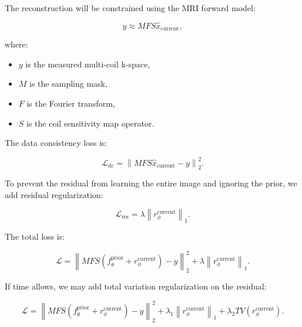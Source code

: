 \documentclass[11pt,a4paper]{article}
\begin{document}
The reconstruction will be constrained using the MRI forward model:

\begin{equation}
    y
    \approx
    MFS\hat{x}_{\mathrm{current}},
\end{equation}

where:

\begin{itemize}
    \item $y$ is the measured multi-coil k-space,
    \item $M$ is the sampling mask,
    \item $F$ is the Fourier transform,
    \item $S$ is the coil sensitivity map operator.
\end{itemize}

The data consistency loss is:

\begin{equation}
    \mathcal{L}_{\mathrm{dc}}
    =
    \left\|
    MFS\hat{x}_{\mathrm{current}}
    -
    y
    \right\|_2^2.
\end{equation}

To prevent the residual from learning the entire image and ignoring the prior, we add residual regularization:

\begin{equation}
    \mathcal{L}_{\mathrm{res}}
    =
    \lambda
    \left\|
    r_{\phi}^{\mathrm{current}}
    \right\|_1.
\end{equation}

The total loss is:

\begin{equation}
    \mathcal{L}
    =
    \left\|
    MFS
    \left(
    f_{\theta}^{\mathrm{prior}}
    +
    r_{\phi}^{\mathrm{current}}
    \right)
    -
    y
    \right\|_2^2
    +
    \lambda
    \left\|
    r_{\phi}^{\mathrm{current}}
    \right\|_1.
\end{equation}

If time allows, we may add total variation regularization on the residual:

\begin{equation}
    \mathcal{L}
    =
    \left\|
    MFS
    \left(
    f_{\theta}^{\mathrm{prior}}
    +
    r_{\phi}^{\mathrm{current}}
    \right)
    -
    y
    \right\|_2^2
    +
    \lambda_1
    \left\|
    r_{\phi}^{\mathrm{current}}
    \right\|_1
    +
    \lambda_2 TV\left(r_{\phi}^{\mathrm{current}}\right).
\end{equation}
\end{document}
